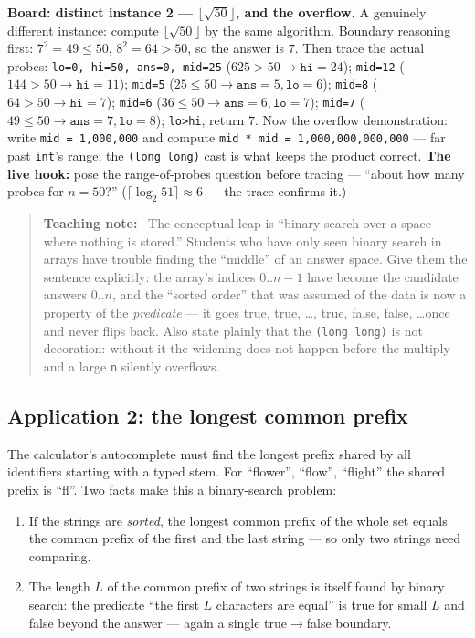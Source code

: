 \documentclass[11pt]{article}
\newenvironment{teachingaside}{\begin{quote}\small\color{primary-gold}\textbf{Teaching note:}\ }{\end{quote}}
\begin{document}
\textbf{Board: distinct instance 2 --- $\lfloor\sqrt{50}\rfloor$, and the overflow.} A genuinely different instance: compute $\lfloor\sqrt{50}\rfloor$ by the same algorithm. Boundary reasoning first: $7^2 = 49 \le 50$, $8^2 = 64 > 50$, so the answer is $7$. Then trace the actual probes: \texttt{lo=0, hi=50, ans=0, mid=25} ($625 > 50 \to \texttt{hi}=24$); \texttt{mid=12} ($144 > 50 \to \texttt{hi}=11$); \texttt{mid=5} ($25 \le 50 \to \texttt{ans}=5, \texttt{lo}=6$); \texttt{mid=8} ($64 > 50 \to \texttt{hi}=7$); \texttt{mid=6} ($36 \le 50 \to \texttt{ans}=6, \texttt{lo}=7$); \texttt{mid=7} ($49 \le 50 \to \texttt{ans}=7, \texttt{lo}=8$); \texttt{lo>hi}, return $7$. Now the overflow demonstration: write \texttt{mid = 1{,}000{,}000} and compute \texttt{mid * mid = 1{,}000{,}000{,}000{,}000} --- far past \texttt{int}'s range; the \texttt{(long long)} cast is what keeps the product correct. \textbf{The live hook:} pose the range-of-probes question before tracing --- ``about how many probes for $n = 50$?'' ($\lceil\log_2 51\rceil \approx 6$ --- the trace confirms it.)

\begin{teachingaside}
The conceptual leap is ``binary search over a space where nothing is stored.'' Students who have only seen binary search in arrays have trouble finding the ``middle'' of an answer space. Give them the sentence explicitly: the array's indices $0..n-1$ have become the candidate answers $0..n$, and the ``sorted order'' that was assumed of the data is now a property of the \emph{predicate} --- it goes true, true, \dots, true, false, false, \dots once and never flips back. Also state plainly that the \texttt{(long long)} is not decoration: without it the widening does not happen before the multiply and a large \texttt{n} silently overflows.
\end{teachingaside}

\subsection{Application 2: the longest common prefix}

The calculator's autocomplete must find the longest prefix shared by all identifiers starting with a typed stem. For ``flower'', ``flow'', ``flight'' the shared prefix is ``fl''. Two facts make this a binary-search problem:

\begin{enumerate}
  \item If the strings are \emph{sorted}, the longest common prefix of the whole set equals the common prefix of the first and the last string --- so only two strings need comparing.
  \item The length $L$ of the common prefix of two strings is itself found by binary search: the predicate ``the first $L$ characters are equal'' is true for small $L$ and false beyond the answer --- again a single true$\to$false boundary.
\end{enumerate}
\end{document}
